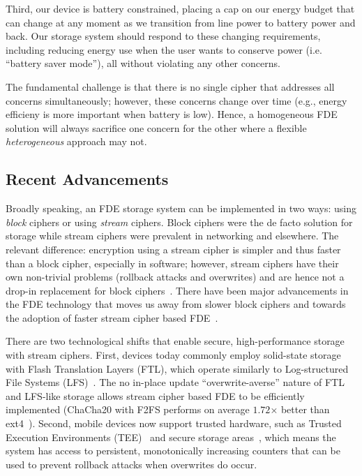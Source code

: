 Third, our device is battery constrained, placing a cap on our energy budget
that can change at any moment as we transition from line power to battery power
and back. Our storage system should respond to these changing requirements,
including reducing energy use when the user wants to conserve power (i.e.
``battery saver mode''), all without violating any other concerns.

The fundamental challenge is that there is no single cipher that
addresses all concerns simultaneously; however, these concerns change
over time (e.g., energy efficieny is more important when battery is
low).  Hence, a homogeneous FDE solution will always sacrifice one
concern for the other where a flexible {\em heterogeneous} approach
may not.


\subsection{Recent Advancements}

Broadly speaking, an FDE storage system can be implemented in two ways: using
{\em block} ciphers or using {\em stream} ciphers. Block ciphers were the de
facto solution for storage while stream ciphers were prevalent in networking and
elsewhere. The relevant difference: encryption using a stream cipher is simpler
and thus faster than a block cipher, especially in software; however, stream
ciphers have their own non-trivial problems (\ie rollback attacks and
overwrites) and are hence not a drop-in replacement for block
ciphers~\cite{StrongBox}. There have been major advancements in the FDE
technology that moves us away from slower block ciphers and towards the adoption
of faster stream cipher based FDE~\cite{Adiantum, StrongBox}.

There are two technological shifts that enable secure, high-performance storage
with stream ciphers. First, devices today commonly employ solid-state storage
with Flash Translation Layers (FTL), which operate similarly to Log-structured
File Systems (LFS)~\cite{LFS, F2FS, NILFS}. The no in-place update
``overwrite-averse'' nature of FTL and LFS-like storage allows stream cipher
based FDE to be efficiently implemented (\eg ChaCha20 with F2FS performs on
average $1.72$× better than ext4~\cite{StrongBox}). Second, mobile devices now
support trusted hardware, such as Trusted Execution Environments
(TEE)~\cite{TrustZone, TEE} and secure storage areas~\cite{eMMC-standard}, which
means the system has access to persistent, monotonically increasing counters
that can be used to prevent rollback attacks when overwrites do occur.


